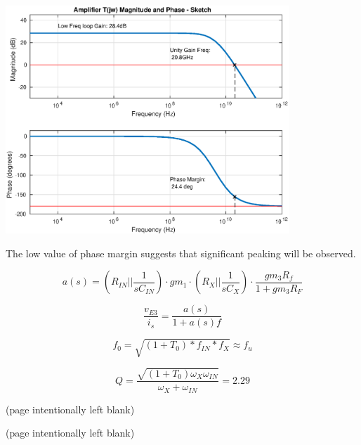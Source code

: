 \documentclass[12pt,a4paper]{article}
\begin{document}
{\centering
	\includegraphics[width=0.8\textwidth]{plots/part_e.eps}
\par}

The low value of phase margin suggests that significant peaking will be observed.

\begin{equation}
  a(s) = (R_{IN} || \frac{1}{sC_{IN}}) \cdot gm_1 \cdot (R_X || \frac{1}{sC_X}) \cdot \frac{gm_3 R_f}{1 + gm_3 R_F}
\end{equation}

\begin{equation}
  \frac{v_{E3}}{i_s} = \frac{a(s)}{1 + a(s) f}
\end{equation}

\begin{equation}
  f_{0} = \sqrt{(1+T_0) * f_{IN} * f_{X}} \approx f_u
\end{equation}

\begin{equation}
  Q = \frac{\sqrt{(1 + T_0) \omega_{X} \omega_{IN}}}{\omega_X + \omega_{IN}} = 2.29
\end{equation}

\pagebreak

(page intentionally left blank)

\pagebreak

(page intentionally left blank)

\pagebreak



\end{document}
